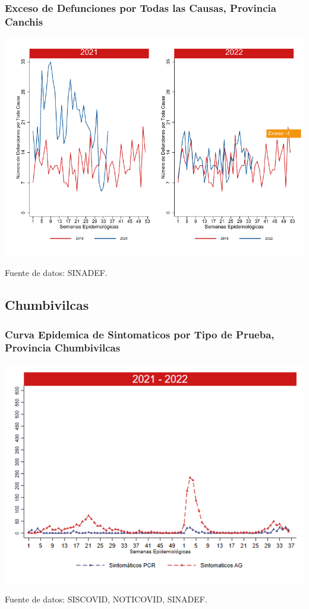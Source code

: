 \documentclass[xcolor=table]{beamer}
\begin{document}
\begin{frame}
	\frametitle{Exceso de Defunciones por Todas las Causas, Provincia Canchis}
	\vspace{-.5cm}
	\begin{center}
		\includegraphics[width=0.8\linewidth, trim={0cm .5cm 0cm 0.2cm},clip]{../figuras/exceso_5.pdf}
	\end{center}
	{\tiny Fuente de datos: SINADEF.}
	
	\hyperlink{indicadores_provinciales}{}
\end{frame}

\subsection{Chumbivilcas}
\begin{frame}[label=Chumbivilcas]
	\frametitle{Curva Epidemica de Sintomaticos por Tipo de Prueba, Provincia Chumbivilcas}
	\vspace{-.5cm}
	\begin{center}
		\includegraphics[width=0.8\linewidth, trim={0cm .5cm 0cm 0.2cm},clip]{../figuras/sinto_prueba20_21_6.png}
	\end{center}
	{\tiny Fuente de datos: SISCOVID, NOTICOVID, SINADEF.}
	\hyperlink{TipoPrueba}{}
\end{frame}
\end{document}
